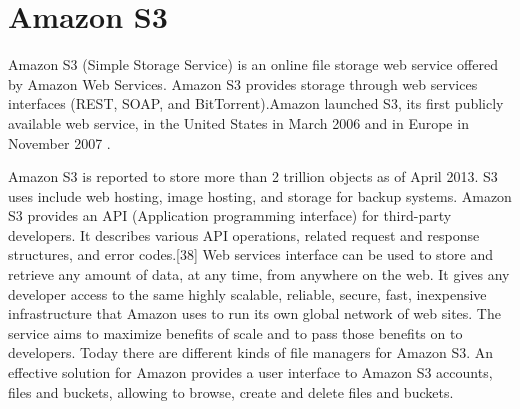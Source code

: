 \section{Amazon S3}
\label{sec:s3_s3}

Amazon S3 (Simple Storage Service) is an online file storage web service offered by Amazon Web Services. Amazon S3 provides storage through web services interfaces (REST, SOAP, and BitTorrent).Amazon launched S3, its first publicly available web service, in the United States in March 2006 and in Europe in November 2007 \cite{s3_overview}.

Amazon S3 is reported to store more than 2 trillion objects as of April 2013.\cite{s3_stats} S3 uses include web hosting, image hosting, and storage for backup systems. 
Amazon S3 provides an API (Application programming interface) for third-party developers. It describes various API operations, related request and response structures, and error codes.[38] Web services interface can be used to store and retrieve any amount of data, at any time, from anywhere on the web. It gives any developer access to the same highly scalable, reliable, secure, fast, inexpensive infrastructure that Amazon uses to run its own global network of web sites. The service aims to maximize benefits of scale and to pass those benefits on to developers. Today there are different kinds of file managers for Amazon S3. An effective solution for Amazon provides a user interface to Amazon S3 accounts, files and buckets, allowing to browse, create and delete files and buckets.
